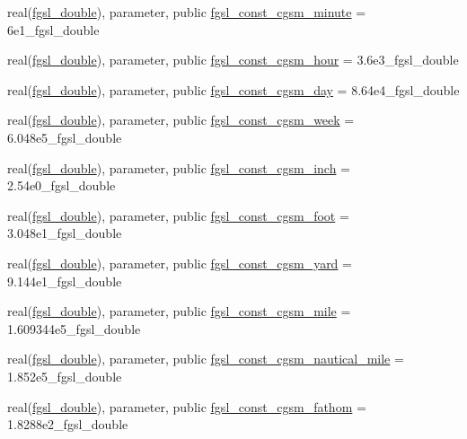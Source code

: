 \begin{DoxyCompactItemize}
\item 
real(\hyperlink{namespacefgsl_a9af5113378e0f000eb479d3f90196ddf}{fgsl\+\_\+double}), parameter, public \hyperlink{namespacefgsl_ab028fa17e53d65adbb35fa580f5e25a0}{fgsl\+\_\+const\+\_\+cgsm\+\_\+minute} = 6e1\+\_\+fgsl\+\_\+double
\item 
real(\hyperlink{namespacefgsl_a9af5113378e0f000eb479d3f90196ddf}{fgsl\+\_\+double}), parameter, public \hyperlink{namespacefgsl_ae4bb30ae02c03177a710c656125616a7}{fgsl\+\_\+const\+\_\+cgsm\+\_\+hour} = 3.\+6e3\+\_\+fgsl\+\_\+double
\item 
real(\hyperlink{namespacefgsl_a9af5113378e0f000eb479d3f90196ddf}{fgsl\+\_\+double}), parameter, public \hyperlink{namespacefgsl_af34712504add6a207ec8e068ff61d8cd}{fgsl\+\_\+const\+\_\+cgsm\+\_\+day} = 8.\+64e4\+\_\+fgsl\+\_\+double
\item 
real(\hyperlink{namespacefgsl_a9af5113378e0f000eb479d3f90196ddf}{fgsl\+\_\+double}), parameter, public \hyperlink{namespacefgsl_ab1a6fad27f87e45e6de1d5b58d7b86fc}{fgsl\+\_\+const\+\_\+cgsm\+\_\+week} = 6.\+048e5\+\_\+fgsl\+\_\+double
\item 
real(\hyperlink{namespacefgsl_a9af5113378e0f000eb479d3f90196ddf}{fgsl\+\_\+double}), parameter, public \hyperlink{namespacefgsl_ad425eda5fab2505e2342ed4f46b5f5f0}{fgsl\+\_\+const\+\_\+cgsm\+\_\+inch} = 2.\+54e0\+\_\+fgsl\+\_\+double
\item 
real(\hyperlink{namespacefgsl_a9af5113378e0f000eb479d3f90196ddf}{fgsl\+\_\+double}), parameter, public \hyperlink{namespacefgsl_a479fa8c0e8ae3d17e949a4a365a39c19}{fgsl\+\_\+const\+\_\+cgsm\+\_\+foot} = 3.\+048e1\+\_\+fgsl\+\_\+double
\item 
real(\hyperlink{namespacefgsl_a9af5113378e0f000eb479d3f90196ddf}{fgsl\+\_\+double}), parameter, public \hyperlink{namespacefgsl_a3f40255d359411c5789f360fd7c2961e}{fgsl\+\_\+const\+\_\+cgsm\+\_\+yard} = 9.\+144e1\+\_\+fgsl\+\_\+double
\item 
real(\hyperlink{namespacefgsl_a9af5113378e0f000eb479d3f90196ddf}{fgsl\+\_\+double}), parameter, public \hyperlink{namespacefgsl_a56582420eb5e22fb229cf4eea9cb3fca}{fgsl\+\_\+const\+\_\+cgsm\+\_\+mile} = 1.\+609344e5\+\_\+fgsl\+\_\+double
\item 
real(\hyperlink{namespacefgsl_a9af5113378e0f000eb479d3f90196ddf}{fgsl\+\_\+double}), parameter, public \hyperlink{namespacefgsl_ad2fef81cdb19dcaed2ce527744cb8600}{fgsl\+\_\+const\+\_\+cgsm\+\_\+nautical\+\_\+mile} = 1.\+852e5\+\_\+fgsl\+\_\+double
\item 
real(\hyperlink{namespacefgsl_a9af5113378e0f000eb479d3f90196ddf}{fgsl\+\_\+double}), parameter, public \hyperlink{namespacefgsl_a8351533377c64da8b76317b3172c1c76}{fgsl\+\_\+const\+\_\+cgsm\+\_\+fathom} = 1.\+8288e2\+\_\+fgsl\+\_\+double

\end{DoxyCompactItemize}
